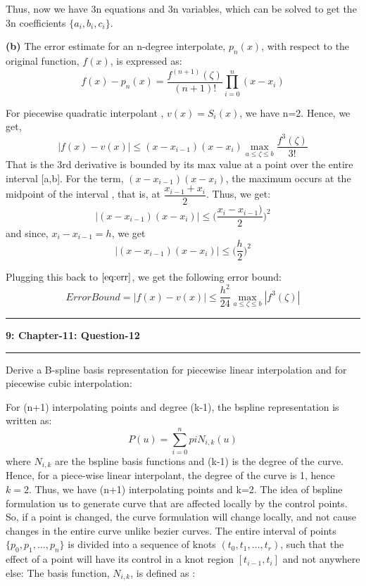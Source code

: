 \documentclass{article}
\newcommand\question[2]{\vspace{.25in}\hrule\textbf{#1: #2}\hrule\vspace{.10in}}
\renewcommand\part[1]{\vspace{.10in}\textbf{(#1)}}
\begin{document}
Thus, now we have 3n equations and 3n variables, which can be solved to get the 3n coefficients $\{a_i, b_i, c_i\}$. \newline

 \part{b} The error estimate for an n-degree interpolate, $p_n(x)$, with respect to the original function, $f(x)$, is expressed as: 
 \[ f(x) - p_n(x) = \dfrac{f^{(n+1)}(\zeta)}{(n+1)!} \prod_{i=0}^n (x - x_i)\]

 For piecewise quadratic interpolant , $v(x) = S_i(x)$, we have n=2. Hence, we get,
 \begin{equation}
  |f(x) - v(x)| \leq (x - x_{i-1})(x - x_i) \max_{a \leq \zeta \leq b} \dfrac{f^3(\zeta)}{3!} 
  \label{eq:err}
 \end{equation}
 That is the 3rd derivative is bounded by its max value at a point over the entire interval [a,b]. 
 For the term, $(x-x_{i-1})(x - x_i)$, the maximum occurs at the midpoint of the interval , that is, at $\dfrac{x_{i-1} + x_i}{2}$. Thus, we get: \newline
 \[ |(x - x_{i-1})(x - x_i)| \leq \bigg ( \dfrac{x_i - x_{i-1})}{2} \bigg )^2 \]
 and since, $x_i - x_{i-1} = h$, we get
 \[ |(x - x_{i-1})(x - x_i)| \leq \bigg ( \dfrac{h}{2} \bigg )^2 \]

 Plugging this back to $\eqref{eq:err}$, we get the following error bound: \newline
 \[ ErrorBound = |f(x) - v(x)| \leq \dfrac{h^2}{24} \max_{a \leq \zeta \leq b} |f^3(\zeta)|\]








 \question{9}{Chapter-11: Question-12}
Derive a B-spline basis representation for piecewise linear interpolation and for piecewise cubic interpolation: \newline

For (n+1) interpolating  points and degree (k-1), the bspline representation is written as: \newline
\begin{equation}
  P(u) = \sum_{i=0}^n pi N_{i,k}(u)
  \label{eq:bsum}
\end{equation}
 where $N_{i,k}$ are the bspline basis functions and (k-1) is the degree of the curve. Hence, for a piece-wise linear interpolant, the degree of the curve is 1, hence $k=2$. Thus, we have (n+1) interpolating points and k=2. \newline
The idea of bspline formulation us to  generate curve that are affected locally by the control points. So, if a point is changed, the curve formulation will change locally, and not cause changes in the entire curve unlike bezier curves. The entire interval of points $\{ p_0, p_1, \dots, p_n\}$ is divided into a sequence of knots $(t_0, t_1, \dots, t_r)$, such that the effect of a point will have its control in a knot region $[t_{i-1}, t_i]$ and not anywhere else: \newline
The basis function, $N_{i,k}$, is defined as :\newline
\end{document}
